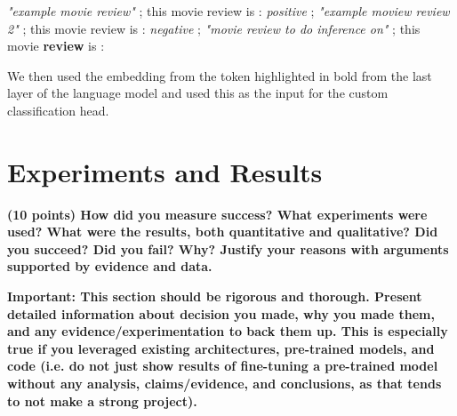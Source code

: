 \documentclass[10pt,twocolumn,letterpaper]{article}
\begin{document}
\textit{"example movie review"} ; this movie review is : \textit{positive} ; \textit{"example moview review 2"} ; this movie review is : \textit{negative} ; \textit{"movie review to do inference on"} ; this movie \textbf{review} is :

We then used the embedding from the token highlighted in bold from the last layer of the language model and used this as the input for the custom classification head.


\section{Experiments and Results}







\textbf{(10 points) How did you measure success? What experiments were used? What were the results, both quantitative and qualitative? Did you succeed? Did you fail? Why? Justify your reasons with arguments supported by evidence and data.}

\textbf{Important: This section should be rigorous and thorough. Present detailed information about decision you made, why you made them, and any evidence/experimentation to back them up. This is especially true if you leveraged existing architectures, pre-trained models, and code (i.e. do not just show results of fine-tuning a pre-trained model without any analysis, claims/evidence, and conclusions, as that tends to not make a strong project). }
\end{document}
